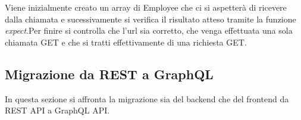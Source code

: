 Viene inizialmente creato un array di Employee che ci si aspetterà di ricevere dalla chiamata e sucessivamente si verifica il risultato atteso tramite la funzione \textit{expect}.Per finire si controlla che l'url sia corretto, che venga effettuata una sola chiamata GET e che si tratti effettivamente di una richiesta GET.
\subsection{Migrazione da REST a GraphQL}
In questa sezione si affronta la migrazione sia del backend che del frontend da REST API a GraphQL API.
